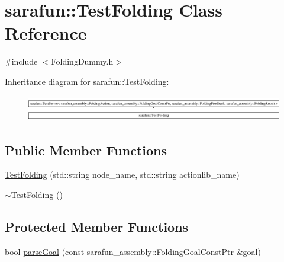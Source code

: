\hypertarget{classsarafun_1_1TestFolding}{\section{sarafun\-:\-:Test\-Folding Class Reference}
\label{classsarafun_1_1TestFolding}
}


{\ttfamily \#include $<$Folding\-Dummy.\-h$>$}

Inheritance diagram for sarafun\-:\-:Test\-Folding\-:\begin{figure}[H]
\begin{center}
\leavevmode
\includegraphics[height=1.140530cm]{classsarafun_1_1TestFolding}
\end{center}
\end{figure}
\subsection*{Public Member Functions}
\begin{DoxyCompactItemize}
\item 
\hyperlink{classsarafun_1_1TestFolding_a8e2588633f0ed83b89bc36cd68e537d8}{Test\-Folding} (std\-::string node\-\_\-name, std\-::string actionlib\-\_\-name)
\item 
\hyperlink{classsarafun_1_1TestFolding_ae84f7398db7911dc72a929e9b4d71726}{$\sim$\-Test\-Folding} ()
\end{DoxyCompactItemize}
\subsection*{Protected Member Functions}
\begin{DoxyCompactItemize}
\item 
bool \hyperlink{classsarafun_1_1TestFolding_a5b02e0313f9561d2ae5d21ad8ddb1c03}{parse\-Goal} (const sarafun\-\_\-assembly\-::\-Folding\-Goal\-Const\-Ptr \&goal)
\end{DoxyCompactItemize}


